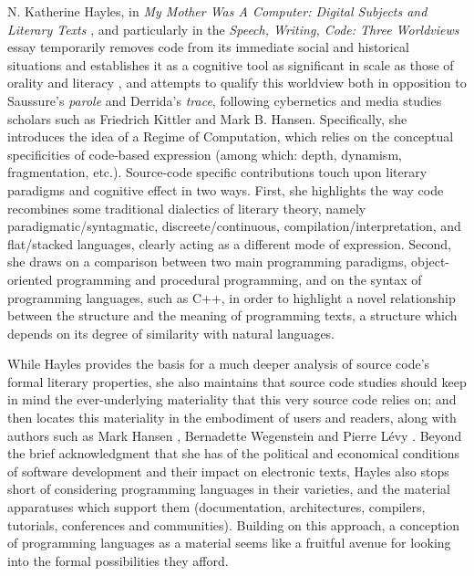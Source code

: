 N. Katherine Hayles, in \emph{My Mother Was A Computer: Digital Subjects and Literary Texts} \citep{hayles_my_2010}, and particularly in the \emph{Speech, Writing, Code: Three Worldviews} essay temporarily removes code from its immediate social and historical situations and establishes it as a cognitive tool as significant in scale as those of orality and literacy \citep{ong_orality_2012}, and attempts to qualify this worldview both in opposition to Saussure's \emph{parole} and Derrida's \emph{trace}, following cybernetics and media studies scholars such as Friedrich Kittler and Mark B. Hansen. Specifically, she introduces the idea of a Regime of Computation, which relies on the conceptual specificities of code-based expression (among which: depth, dynamism, fragmentation, etc.). Source-code specific contributions touch upon literary paradigms and cognitive effect in two ways. First, she highlights the way code recombines some traditional dialectics of literary theory, namely paradigmatic/syntagmatic, discreete/continuous, compilation/interpretation, and flat/stacked languages, clearly acting as a different mode of expression. Second, she draws on a comparison between two main programming paradigms, object-oriented programming and procedural programming, and on the syntax of programming languages, such as C++, in order to highlight a novel relationship between the structure and the meaning of programming texts, a structure which depends on its degree of similarity with natural languages.

While Hayles provides the basis for a much deeper analysis of source code's formal literary properties, she also maintains that source code studies should keep in mind the ever-underlying materiality that this very source code relies on; and then locates this materiality in the embodiment of users and readers, along with authors such as Mark Hansen \citep{hansen_bodies_2006}, Bernadette Wegenstein \citep{wegenstein_bodies_2010} and Pierre Lévy \citep{levy_programmation_1992}. Beyond the brief acknowledgment that she has of the political and economical conditions of software development and their impact on electronic texts, Hayles also stops short of considering programming languages in their varieties, and the material apparatuses which support them (documentation, architectures, compilers, tutorials, conferences and communities). Building on this approach, a conception of programming languages as a material seems like a fruitful avenue for looking into the formal possibilities they afford.

